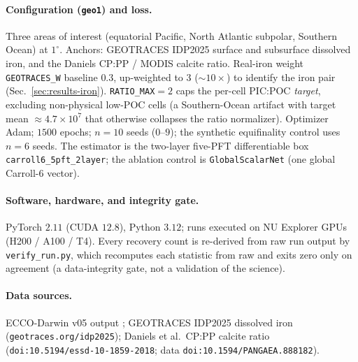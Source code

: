 \documentclass[11pt]{article}
\begin{document}
\paragraph{Configuration (\texttt{geo1}) and loss.}
Three areas of interest (equatorial Pacific, North Atlantic subpolar, Southern
Ocean) at $1^\circ$. Anchors: GEOTRACES IDP2025 surface and subsurface dissolved
iron, and the Daniels CP:PP / MODIS calcite ratio. Real-iron weight
\texttt{GEOTRACES\_W} baseline $0.3$, up-weighted to $3$ ($\sim\!10\times$) to
identify the iron pair (Sec.~\ref{sec:results-iron}). \texttt{RATIO\_MAX}$=2$ caps
the per-cell PIC:POC \emph{target}, excluding non-physical low-POC cells (a
Southern-Ocean artifact with target mean $\approx4.7\times10^{7}$ that otherwise
collapses the ratio normalizer). Optimizer Adam; $1500$ epochs; $n{=}10$ seeds
($0$--$9$); the synthetic equifinality control uses $n{=}6$ seeds. The estimator is
the two-layer five-PFT differentiable box \texttt{carroll6\_5pft\_2layer}; the
ablation control is \texttt{GlobalScalarNet} (one global Carroll-6 vector).

\paragraph{Software, hardware, and integrity gate.}
PyTorch $2.11$ (CUDA $12.8$), Python $3.12$; runs executed on NU Explorer GPUs
(H200 / A100 / T4). Every recovery count is re-derived from raw run output by
\texttt{verify\_run.py}, which recomputes each statistic from raw and exits zero
only on agreement (a data-integrity gate, not a validation of the science).

\paragraph{Data sources.}
ECCO-Darwin v05 output \cite{carroll2022}; GEOTRACES IDP2025 dissolved iron
(\texttt{geotraces.org/idp2025}); Daniels et al.\ CP:PP calcite ratio
(\texttt{doi:10.5194/essd-10-1859-2018}; data \texttt{doi:10.1594/PANGAEA.888182}).
\end{document}

